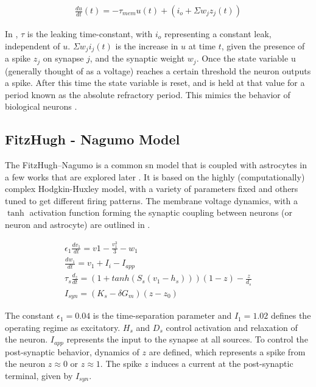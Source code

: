    \begin{align}
        \frac{du}{dt}(t) = -\tau_{mem}u(t)+(i_o + \Sigma w_jz_j(t)) \label{eq:lif}
    \end{align}
    
    In , $\tau$ is the leaking time-constant, with $i_o$
    representing a constant leak, independent of $u$. $\Sigma w_ji_j(t)$ is the
    increase in $u$ at time $t$, given the presence of a spike $z_j$ on synapse
    $j$, and the synaptic weight $w_j$. Once the state variable u (generally
    thought of as a voltage) reaches a certain threshold the neuron outputs a
    spike. After this time the state variable is reset, and is held at that
    value for a period known as the absolute refractory period. This mimics the
    behavior of biological neurons \parencite{ponulak_2011}.



    \subsection{FitzHugh - Nagumo Model}
    The FitzHugh–Nagumo is a common \gls{sn} model that is coupled with
    astrocytes in a few works that are explored later \parencite{postnov_2009,
      postnov_2007}. It is based on the highly (computationally) complex
    Hodgkin-Huxley model, with a variety of parameters fixed and others tuned to
    get different firing patterns. The membrane voltage dynamics, with a $\tanh$
    activation function forming the synaptic coupling between neurons (or neuron
    and astrocyte) are outlined in \parencite{postnov_2009}.

    \begin{align}
      \epsilon_1 \frac{dv_1}{dt} = v1 - \frac{v_1^3}{3} -
      w_1 \label{eq:fn_neuron}  \\
      \frac{dw_1}{dt} = v_1 + I_i - I_{app} \\
      \tau_s \frac{d_z}{dt} = (1 + tanh(S_s(v_1 - h_s)))(1 - z) - \frac{z}{d_s} \label{eq:fitz_nn}
      \\
      I_{syn} = (K_s - \delta G_m)(z - z_0)
    \end{align}

    The constant $\epsilon_1 = 0.04$ is the time-separation parameter and
    $I_1 = 1.02$ defines the operating regime as excitatory. $H_s$ and $D_s$
    control activation and relaxation of the neuron. $I_{app}$ represents the
    input to the synapse at all sources. To control the post-synaptic behavior,
    dynamics of $z$ are defined, which represents a spike from the neuron
    $z \approx 0$ or $z \approx 1$. The spike $z$ induces a current at the
    post-synaptic terminal, given by $I_{syn}$.

